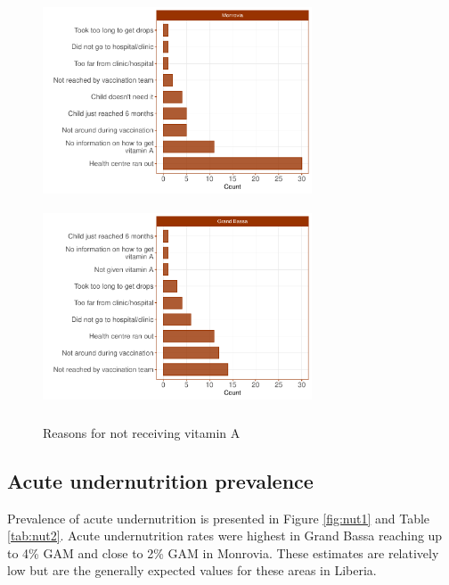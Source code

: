 \documentclass[12pt,a4paper]{article}
\begin{document}
\begin{figure}[H]

{\centering \includegraphics[width=8cm,height=6cm]{liberiaCoverageReport_files/figure-latex/vit3a-1} \includegraphics[width=8cm,height=6cm]{liberiaCoverageReport_files/figure-latex/vit3a-2} 

}

\caption{Reasons for not receiving vitamin A}\label{fig:vit3a}
\end{figure}

\newpage

\hypertarget{acute-undernutrition-prevalence}{%
\subsection{Acute undernutrition prevalence}\label{acute-undernutrition-prevalence}}

Prevalence of acute undernutrition is presented in Figure \ref{fig:nut1} and Table \ref{tab:nut2}. Acute undernutrition rates were highest in Grand Bassa reaching up to 4\% GAM and close to 2\% GAM in Monrovia. These estimates are relatively low but are the generally expected values for these areas in Liberia.
\end{document}
